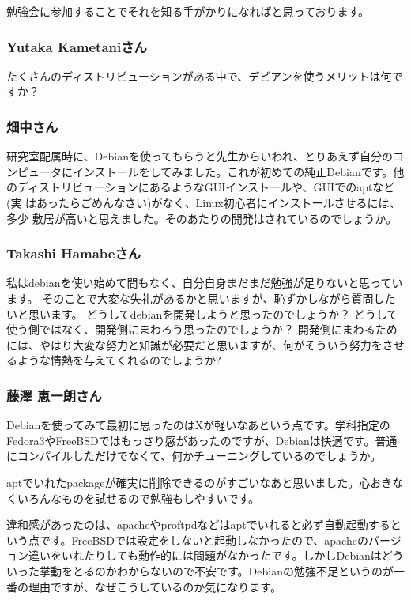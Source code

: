 \documentclass[mingoth,a4paper]{jsarticle}
\begin{document}
勉強会に参加することでそれを知る手がかりになればと思っております。

\subsubsection{Yutaka Kametaniさん}

たくさんのディストリビューションがある中で、デビアンを使うメリットは何で
すか？

\subsubsection{畑中さん}

研究室配属時に、Debianを使ってもらうと先生からいわれ、とりあえず自分のコ
ンピュータにインストールをしてみました。これが初めての純正Debianです。他
のディストリビューションにあるようなGUIインストールや、GUIでのaptなど(実
はあったらごめんなさい)がなく、Linux初心者にインストールさせるには、多少
敷居が高いと思えました。そのあたりの開発はされているのでしょうか。

\subsubsection{Takashi Hamabeさん}
私はdebianを使い始めて間もなく、自分自身まだまだ勉強が足りないと思っています。
そのことで大変な失礼があるかと思いますが、恥ずかしながら質問したいと思います。
どうしてdebianを開発しようと思ったのでしょうか？
どうして使う側ではなく、開発側にまわろう思ったのでしょうか？
開発側にまわるためには、やはり大変な努力と知識が必要だと思いますが、何がそういう努力をさせるような情熱を与えてくれるのでしょうか?

\subsubsection{藤澤 恵一朗さん}

Debianを使ってみて最初に思ったのはXが軽いなあという点です。学科指定のFedora3やFreeBSDではもっさり感があったのですが、Debianは快適です。普通にコンパイルしただけでなくて、何かチューニングしているのでしょうか。

aptでいれたpackageが確実に削除できるのがすごいなあと思いました。心おきなくいろんなものを試せるので勉強もしやすいです。

違和感があったのは、apacheやproftpdなどはaptでいれると必ず自動起動するという点です。FreeBSDでは設定をしないと起動しなかったので、apacheのバージョン違いをいれたりしても動作的には問題がなかったです。しかしDebianはどういった挙動をとるのかわからないので不安です。Debianの勉強不足というのが一番の理由ですが、なぜこうしているのか気になります。
\end{document}
